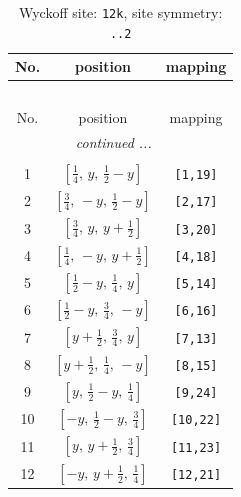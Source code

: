 \documentclass[fleqn,8pt]{jsarticle}
\begin{document}
\begin{longtable}{ccc}
\caption{Wyckoff site: {\tt 12k}, site symmetry: {\tt ..2}}
 \\
 \hline \hline
No. & position & mapping \\ \hline \endfirsthead

\multicolumn{2}{l}{\tablename\ \thetable{}} \\
 \hline \hline
No. & position & mapping \\ \hline \endhead

 \hline \hline
\multicolumn{2}{r}{\footnotesize\it continued ...} \\ \endfoot

 \hline \hline
\multicolumn{2}{r}{} \\ \endlastfoot

1 & $\left[ \frac{1}{4},\, y,\, \frac{1}{2} - y \right]$ & {\tt [1,19]} \\ \hline
2 & $\left[ \frac{3}{4},\, - y,\, \frac{1}{2} - y \right]$ & {\tt [2,17]} \\ \hline
3 & $\left[ \frac{3}{4},\, y,\, y + \frac{1}{2} \right]$ & {\tt [3,20]} \\ \hline
4 & $\left[ \frac{1}{4},\, - y,\, y + \frac{1}{2} \right]$ & {\tt [4,18]} \\ \hline
5 & $\left[ \frac{1}{2} - y,\, \frac{1}{4},\, y \right]$ & {\tt [5,14]} \\ \hline
6 & $\left[ \frac{1}{2} - y,\, \frac{3}{4},\, - y \right]$ & {\tt [6,16]} \\ \hline
7 & $\left[ y + \frac{1}{2},\, \frac{3}{4},\, y \right]$ & {\tt [7,13]} \\ \hline
8 & $\left[ y + \frac{1}{2},\, \frac{1}{4},\, - y \right]$ & {\tt [8,15]} \\ \hline
9 & $\left[ y,\, \frac{1}{2} - y,\, \frac{1}{4} \right]$ & {\tt [9,24]} \\ \hline
10 & $\left[ - y,\, \frac{1}{2} - y,\, \frac{3}{4} \right]$ & {\tt [10,22]} \\ \hline
11 & $\left[ y,\, y + \frac{1}{2},\, \frac{3}{4} \right]$ & {\tt [11,23]} \\ \hline
12 & $\left[ - y,\, y + \frac{1}{2},\, \frac{1}{4} \right]$ & {\tt [12,21]} \\
\end{longtable}
\renewcommand{\arraystretch}{1.2}
\end{document}
